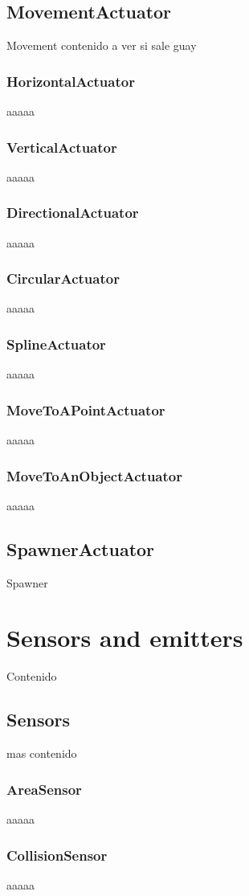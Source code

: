 \subsection{MovementActuator}
Movement contenido a ver si sale guay
\subsubsection{HorizontalActuator}
aaaaa
\subsubsection{VerticalActuator}
aaaaa
\subsubsection{DirectionalActuator}
aaaaa
\subsubsection{CircularActuator}
aaaaa
\subsubsection{SplineActuator}
aaaaa
\subsubsection{MoveToAPointActuator}
aaaaa
\subsubsection{MoveToAnObjectActuator}
aaaaa

\subsection{SpawnerActuator}
Spawner
\section{Sensors and emitters}
Contenido
\subsection{Sensors}
mas contenido
\subsubsection{AreaSensor}
aaaaa
\subsubsection{CollisionSensor}
aaaaa
